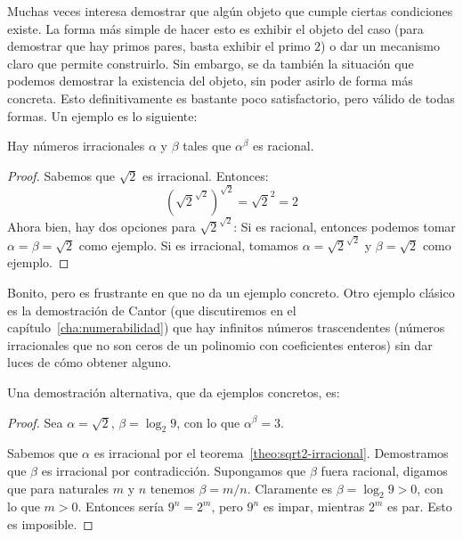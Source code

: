   Muchas veces interesa demostrar que algún objeto
  que cumple ciertas condiciones existe.
  La forma más simple de hacer esto es exhibir el objeto del caso
  (para demostrar que hay primos pares,
   basta exhibir el primo \(2\))
  o dar un mecanismo claro que permite construirlo.
  Sin embargo,
  se da también la situación
  que podemos demostrar la existencia del objeto,
  sin poder asirlo de forma más concreta.
  Esto definitivamente es bastante poco satisfactorio,
  pero válido de todas formas.
  Un ejemplo es lo siguiente:
  \begin{proposition}
    Hay números irracionales \(\alpha\) y \(\beta\)%
    tales que \(\alpha^\beta\) es racional.
  \end{proposition}
  \begin{proof}
    Sabemos que \(\sqrt{2}\) es irracional.
    Entonces:
    \begin{equation*}
      \left( \sqrt{2}^{\sqrt{2}} \right)^{\sqrt{2}}
	= \sqrt{2}^2
	= 2
    \end{equation*}
    Ahora bien,
    hay dos opciones para \(\sqrt{2}^{\sqrt{2}}\):
    Si es racional,
    entonces podemos tomar \(\alpha = \beta = \sqrt{2}\)
    como ejemplo.
    Si es irracional,
    tomamos \(\alpha = \sqrt{2}^{\sqrt{2}}\) y \(\beta = \sqrt{2}\)
    como ejemplo.
  \end{proof}
  Bonito,
  pero es frustrante en que no da un ejemplo concreto.
  Otro ejemplo clásico es la demostración de Cantor%
  (que discutiremos en el capítulo~\ref{cha:numerabilidad})
  que hay infinitos números trascendentes%
  (números irracionales
   que no son ceros de un polinomio con coeficientes enteros)
  sin dar luces de cómo obtener alguno.

  Una demostración alternativa,
  que da ejemplos concretos,
  es:
  \begin{proof}
    Sea \(\alpha = \sqrt{2}\),
    \(\beta = \log_2 9\),
    con lo que \(\alpha^\beta = 3\).

    Sabemos que \(\alpha\) es irracional
    por el teorema~\ref{theo:sqrt2-irracional}.
    Demostramos que \(\beta\) es irracional por contradicción.%
    Supongamos que \(\beta\) fuera racional,
    digamos que para naturales \(m\) y \(n\)
    tenemos \(\beta = m / n\).
    Claramente es \(\beta = \log_2 9 > 0\),
    con lo que \(m > 0\).
    Entonces sería \(9^n = 2^m\),
    pero \(9^n\) es impar,
    mientras \(2^m\) es par.
    Esto es imposible.
  \end{proof}

